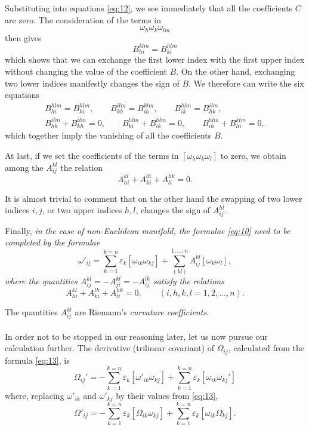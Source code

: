 \documentclass[leqno,12pt]{article}
\makeatletter
\let\old@epsilon\epsilon
\let\old@varepsilon\varepsilon
\let\epsilon\old@varepsilon
\let\varepsilon\old@epsilon
\theoremstyle{shape1}
\theoremstyle{shape0}
\theoremstyle{shape2}
\theoremstyle{definition}
\makeatother
\begin{document}
Substituting into equations \eqref{eq:12}, we see immediately that all the coefficients $C$ are zero. The consideration of the terms in
\[
\omega_{h}\omega_{k}\omega_{lm}
\]
then gives
\[
B^{klm}_{hi}=B^{hlm}_{ki}
\]
which shows that we can exchange the first lower index with the first upper index without changing the value of the coefficient $B$. On the other hand, exchanging two lower indices manifestly changes the sign of $B$. We therefore can write the six equations
\begin{gather*}
  B^{hlm}_{hi}=B^{hlm}_{ki},\qquad B^{ilm}_{kh}=B^{klm}_{ih},\qquad B^{hlm}_{ik}=B^{ilm}_{hk},\\
  B^{ilm}_{hk}+B^{ilm}_{kh}=0,\qquad B^{hlm}_{ki}+B^{hlm}_{ik}=0,\qquad B^{hlm}_{ih}+B^{klm}_{hi}=0,
\end{gather*}
which together imply the vanishing of all the coefficients $B$.

At last, if we set the coefficients of the terms in $[\omega_{h}\omega_{k}\omega_{l}]$ to zero, we obtain among the $A^{kl}_{ij}$ the relation
\[
A^{kl}_{hi}+A^{lh}_{ki}+A^{hk}_{li}=0.
\]

It is almost trivial to comment that on the other hand the swapping of two lower indices $i, j$, or two upper indices $h,l$, changes the sign of $A^{hl}_{ij}$.

Finally, \emph{in the case of non-Euclidean manifold, the formulae \eqref{eq:10} need to be completed by the formulae}
\begin{equation}
  \label{eq:14}
  \omega'_{ij}=\sum_{k=1}^{k=n}\epsilon_{k}[\omega_{ik}\omega_{kj}]+\sum_{(kl)}^{1,\dots,n}A^{kl}_{ij}[\omega_{k}\omega_{l}],
\end{equation}
\emph{where the quantities $A^{kl}_{ij}=-A^{kl}_{ji}=-A^{lk}_{ij}$ satisfy the relations}
\begin{equation}
  \label{eq:15}
  A^{kl}_{hi}+A^{lh}_{ki}+A^{hk}_{li}=0,\qquad(i,h,k,l=1,2,\dots,n).
\end{equation}

The quantities $A^{kl}_{ij}$ are Riemann's \emph{curvature coefficients}.

\paragraph{}
\label{sec:8}
In order not to be stopped in our reasoning later, let us now pursue our calculation further. The derivative (trilinear covariant) of $\Omega_{ij}$, calculated from the formula \eqref{eq:13}, is
\[
\Omega_{ij}'=-\sum_{k=1}^{k=n}\epsilon_{k}[\omega'_{ik}\omega_{kj}]+\sum_{k=1}^{k=n}\epsilon_{k}[\omega_{ik}\omega_{kj}']
\]
where, replacing $\omega'_{ik}$ and $\omega'_{kj}$ by their values from \eqref{eq:13},
\begin{equation}
  \label{eq:16}
  \Omega'_{ij}=-\sum_{k=1}^{k=n}\epsilon_{k}[\Omega_{ik}\omega_{kj}]+\sum_{k=1}^{k=n}\epsilon_{k}[\omega_{ik}\Omega_{kj}].
\end{equation}
\end{document}
